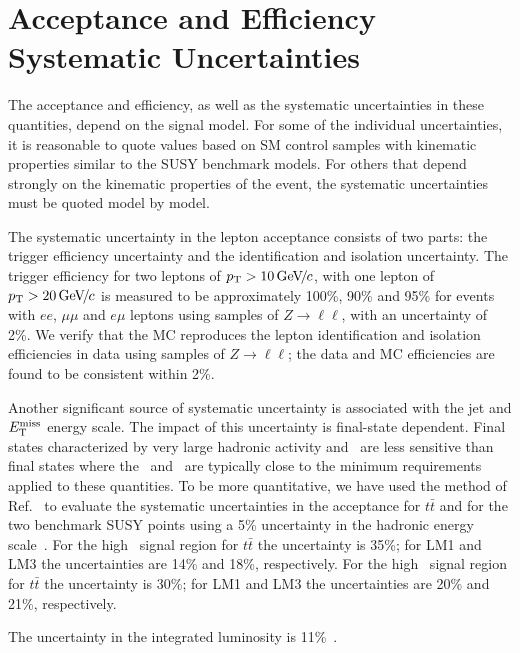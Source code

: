 \section{Acceptance and Efficiency Systematic Uncertainties}
\label{sec:systematics}

The acceptance and efficiency, as well as the systematic uncertainties in these quantities, 
depend on the signal model.
For some of the individual uncertainties, it is reasonable to quote values 
based on SM control samples with kinematic properties similar to the SUSY benchmark models. 
For others that depend strongly on the kinematic properties of the event, the systematic
uncertainties must be quoted model by model.

The systematic uncertainty in the lepton acceptance consists
of two parts: the trigger efficiency uncertainty and the 
identification and isolation uncertainty. The trigger efficiency 
for two leptons of $p_{\mathrm{T}}>10{\,\text{Ge\hspace{-.08em}V\hspace{-0.16em}/\hspace{-0.08em}}c}$, with one lepton of 
$p_{\mathrm{T}}>20{\,\text{Ge\hspace{-.08em}V\hspace{-0.16em}/\hspace{-0.08em}}c}$ is measured to be approximately 100\%, 90\% and 95\%
for events with $ee$, $\mu\mu$ and $e\mu$ leptons using samples of $Z \to \ell\ell$, 
with an uncertainty of 2\%. We verify that the MC reproduces the lepton identification and isolation efficiencies in data using
samples of $Z \to \ell\ell$; the data and MC efficiencies are found to be consistent within 2\%.

Another significant source of systematic uncertainty is 
associated with the jet and $E_{\mathrm{T}}^{\text{miss}}$ energy scale.  The impact
of this uncertainty is final-state dependent.  Final
states characterized by very large hadronic activity and \MET\ are 
less sensitive than final states where the \MET\ and \HT\ 
are typically close to the minimum requirements applied to these quantities.  To be more quantitative,
we have used the method of Ref.~\cite{ref:top} to evaluate
the systematic uncertainties in the acceptance for $t\bar{t}$ 
and for the two benchmark SUSY points using a 5\% uncertainty in the hadronic 
energy scale~\cite{ref:jes}.
For the high \MET\ signal region for $t\bar{t}$ the uncertainty is 35\%; for LM1 and LM3 the 
uncertainties are 14\% and 18\%, respectively.
For the high \Ht\ signal region for $t\bar{t}$ the uncertainty is 30\%; for LM1 and LM3 the 
uncertainties are 20\% and 21\%, respectively.

The uncertainty in the integrated luminosity is 11\%~\cite{ref:lumi}.
